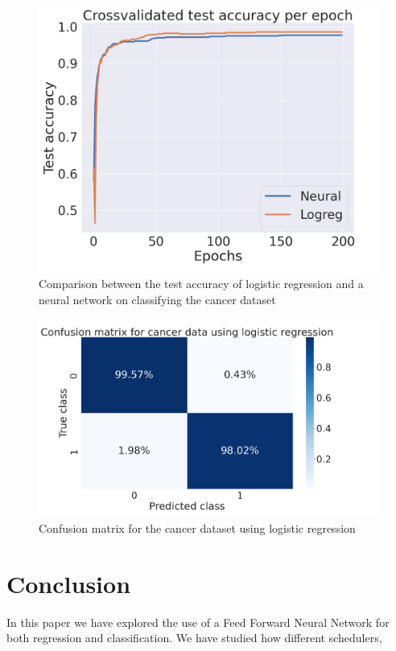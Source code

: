 \documentclass[onecolumn,10pt,cleanfoot]{asme2ej}
\begin{document}
\begin{figure}[h]
\centerline{\includegraphics[width=5in]{figure/cancerlogneur.png}}
\caption{Comparison between the test accuracy of logistic regression and a neural network on classifying the cancer dataset}
\label{cancerlogneur}
\end{figure}

\begin{figure}[h]
\centerline{\includegraphics[width=5in]{figure/cancerconflog.png}}
\caption{Confusion matrix for the cancer dataset using logistic regression}
\label{cancerconflog}
\end{figure}

\section{Conclusion}

In this paper we have explored the use of a Feed Forward Neural Network for both regression and classification. We have studied how different schedulers, 
\end{document}
